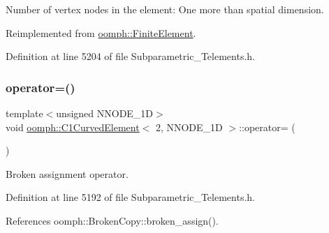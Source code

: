 Number of vertex nodes in the element\+: One more than spatial dimension. 



Reimplemented from \hyperlink{classoomph_1_1FiniteElement_a45631a7aa50efc3123a921d114f84cba}{oomph\+::\+Finite\+Element}.



Definition at line 5204 of file Subparametric\+\_\+\+Telements.\+h.

\mbox{\label{classoomph_1_1C1CurvedElement_3_012_00_01NNODE__1D_01_4_a2c69150bcb82422fb38db3eeea3b0606}} 
\subsubsection{\texorpdfstring{operator=()}{operator=()}}
{\footnotesize\ttfamily template$<$unsigned N\+N\+O\+D\+E\+\_\+1D$>$ \\
void \hyperlink{classoomph_1_1C1CurvedElement}{oomph\+::\+C1\+Curved\+Element}$<$ 2, N\+N\+O\+D\+E\+\_\+1D $>$\+::operator= (\begin{DoxyParamCaption}\item[{const \hyperlink{classoomph_1_1C1CurvedElement}{C1\+Curved\+Element}$<$ 2, N\+N\+O\+D\+E\+\_\+1D $>$ \&}]{ }\end{DoxyParamCaption})\hspace{0.3cm}{\ttfamily [inline]}}



Broken assignment operator. 



Definition at line 5192 of file Subparametric\+\_\+\+Telements.\+h.



References oomph\+::\+Broken\+Copy\+::broken\+\_\+assign().

\mbox{\label{classoomph_1_1C1CurvedElement_3_012_00_01NNODE__1D_01_4_ab90480a9e420ce7507931376fca7dbba}} 
